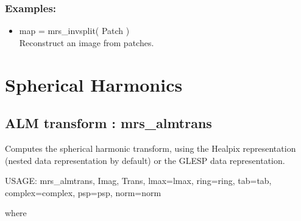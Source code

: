 \subsubsection*{Examples:} 
\begin{itemize}
\item map = mrs\_invsplit( Patch ) \\
Reconstruct an image from patches.
\end{itemize}



\section{Spherical Harmonics}

\subsection{ALM transform : mrs\_almtrans}
Computes the spherical harmonic transform, using the Healpix representation (nested data representation by default) or the GLESP data representation.
{\bf
\begin{center}
     USAGE: mrs\_almtrans, Imag, Trans, lmax=lmax, ring=ring, tab=tab, complex=complex, psp=psp, norm=norm
\end{center}}
where
